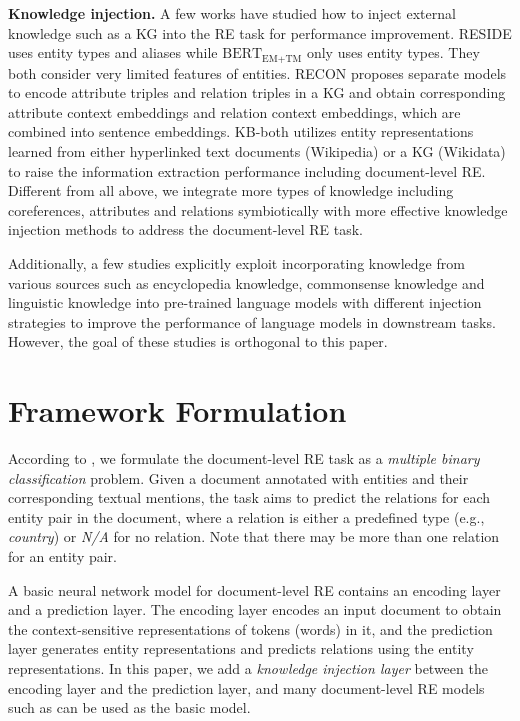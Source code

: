 \documentclass[runningheads]{llncs}
\begin{document}
\textbf{Knowledge injection.} A few works have studied how to inject external knowledge such as a KG into the RE task for performance improvement.
RESIDE \cite{vashishth2018reside} uses entity types and aliases while $\text{BERT}_\text{EM+TM}$ \cite{fernandez2020enhancing} only uses entity types.
They both consider very limited features of entities.
RECON \cite{bastos2021recon} proposes separate models to encode attribute triples and relation triples in a KG and obtain corresponding attribute context embeddings and relation context embeddings, which are combined into sentence embeddings. 
KB-both \cite{verlinden2021injecting} utilizes entity representations learned from either hyperlinked text documents (Wikipedia) or a KG (Wikidata) to raise the information extraction performance including document-level RE. 
Different from all above, we integrate more types of knowledge including coreferences, attributes and relations symbiotically with more effective knowledge injection methods to address the document-level RE task.

Additionally, a few studies \cite{liu2020kbert,wei2021knowledge,zhang2019ernie} explicitly exploit incorporating knowledge from various sources such as encyclopedia knowledge, commonsense knowledge and linguistic
knowledge into pre-trained language models with different injection strategies to improve the performance of language models in downstream tasks.
However, the goal of these studies is orthogonal to this paper.


\section{Framework Formulation}
\label{sect:problem}

According to \cite{tang2020hin,yao2019docred,zhou2021document}, we formulate the document-level RE task as a \emph{multiple binary classification} problem.
Given a document annotated with entities and their corresponding textual mentions, the task aims to predict the relations for each entity pair in the document, where a relation is either a predefined type (e.g., \textit{country}) or \textit{N/A} for no relation.
Note that there may be more than one relation for an entity pair.

A basic neural network model \cite{yao2019docred} for document-level RE contains an encoding layer and a prediction layer.
The encoding layer encodes an input document to obtain the context-sensitive representations of tokens (words) in it, and the prediction layer generates entity representations and predicts relations using the entity representations.
In this paper, we add a \emph{knowledge injection layer} between the encoding layer and the prediction layer, and many document-level RE models such as \cite{wang2020global,yao2019docred,zhou2021document} can be used as the basic model. 
\end{document}
